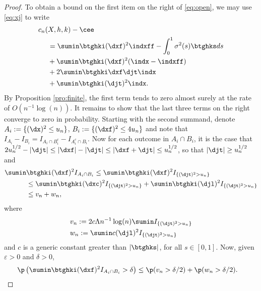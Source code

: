\begin{proof}
     To obtain a bound on the first item on the right of \eqref{eq:open}, we may use \eqref{eq:xj} to write
    \begin{align}
c_n ( & X, h, k) - \cee  \notag  \\
      & =  \sumin \btghki  (\dxf)^2 \indxff - \int^{1}_{0} \sigma^2(s) \btghks ds \notag\\
      & + \sumin \btghki(\dxf)^2 (\indx - \indxff) \notag\\
      &+ 2 \sumin \btghki\dxf \djt \indx \notag \\
      & + \sumin \btghki(\djt)^2\indx.
      \label{}
    \end{align}
    By Proposition \eqref{pro:finite}, the first term tends to zero almost surely at the rate of $O(n^{-1} \log(n))$. It remains to show that the last three terms on the right converge to zero in probability. Starting with the second summand, denote $A_i := \{(\dx)^2 \le u_n\}$,  $B_i   := \{(\dxf)^2 \le 4 u_n\}$ and note that $I_{A_i} - I_{B_i} = I_{A_i \cap B_i^c} - I_{A^c_i\cap B_i}$. Now for each outcome in $A_i \cap B_i$, it is the case that $2 u_n^{1/2} - \vert \djt \vert \le \vert \dxf \vert - \vert \djt \vert \le \vert \dxf + \djt  \vert \le u_n^{1/2}$, so that $\vert \djt \vert \ge u_n^{1/2}$ and 
    \begin{align}
      \sumin & \btghki(\dxf)^2 I_{A_i \cap B_i} \le \sumin \btghki(\dxf)^2 I_{\{(\djt)^2 > u_n\}}\notag\\
       & \le \sumin \btghki(\dxc)^2 I_{\{(\djt)^2 > u_n\}} + \sumin \btghki(\djl)^2 I_{\{(\djt)^2 > u_n\}}\notag\\
       & \le  v_n + w_n, 
      \label{}
    \end{align}
    where \begin{align} &v_n :=  2c \Lambda n^{-1} \log(n) \sumin I_{\{(\djt)^2 > u_n\}} \notag \\ & w_n: =  \sumin c (\djl)^2 I_{\{(\djt)^2 > u_n\}}\notag \end{align}  and $c$ is a generic constant greater than $\vert \btghks \vert$, for all $s \in [0,1]$. Now, given  $\varepsilon > 0$ and $\delta > 0$,
    \begin{align}
     \p &\left(\sumin  \btghki(\dxf)^2 I_{A_i \cap B_i} > \delta \right) \le \p(v_n > \delta/2) + \p(w_n > \delta/2) \notag. 
      \label{}
    \end{align}

\end{proof}
